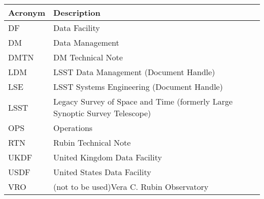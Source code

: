 \addtocounter{table}{-1}
\begin{longtable}{p{}p{}}\hline
\textbf{Acronym} & \textbf{Description}  \\\hline

DF & Data Facility \\\hline
DM & Data Management \\\hline
DMTN & DM Technical Note \\\hline
LDM & LSST Data Management (Document Handle) \\\hline
LSE & LSST Systems Engineering (Document Handle) \\\hline
LSST & Legacy Survey of Space and Time (formerly Large Synoptic Survey Telescope) \\\hline
OPS & Operations \\\hline
RTN & Rubin Technical Note \\\hline
UKDF & United Kingdom Data Facility \\\hline
USDF & United States Data Facility \\\hline
VRO & (not to be used)Vera C. Rubin Observatory \\\hline
\end{longtable}
